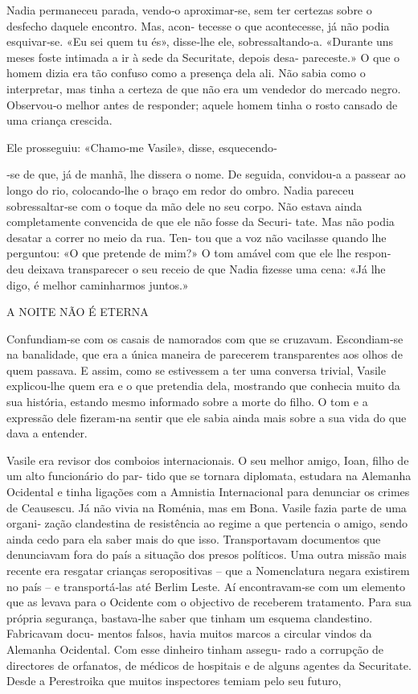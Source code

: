 Nadia permaneceu parada, vendo‑o aproximar‑se, sem ter certezas sobre o
desfecho daquele encontro. Mas, acon‑ tecesse o que acontecesse, já não
podia esquivar‑se. «Eu sei quem tu és», disse‑lhe ele, sobressaltando‑a.
«Durante uns meses foste intimada a ir à sede da Securitate, depois
desa‑ pareceste.» O que o homem dizia era tão confuso como a presença
dela ali. Não sabia como o interpretar, mas tinha a certeza de que não
era um vendedor do mercado negro. Observou‑o melhor antes de responder;
aquele homem tinha o rosto cansado de uma criança crescida.

Ele prosseguiu: «Chamo‑me Vasile», disse, esquecendo‑

‑se de que, já de manhã, lhe dissera o nome. De seguida, convidou‑a a
passear ao longo do rio, colocando‑lhe o braço em redor do ombro. Nadia
pareceu sobressaltar‑se com o toque da mão dele no seu corpo. Não estava
ainda completamente convencida de que ele não fosse da Securi‑ tate. Mas
não podia desatar a correr no meio da rua. Ten‑ tou que a voz não
vacilasse quando lhe perguntou: «O que pretende de mim?» O tom amável
com que ele lhe respon‑ deu deixava transparecer o seu receio de que
Nadia fizesse uma cena: «Já lhe digo, é melhor caminharmos juntos.»

A NOITE NÃO É ETERNA

Confundiam‑se com os casais de namorados com que se cruzavam.
Escondiam‑se na banalidade, que era a única maneira de parecerem
transparentes aos olhos de quem passava. E assim, como se estivessem a
ter uma conversa trivial, Vasile explicou‑lhe quem era e o que pretendia
dela, mostrando que conhecia muito da sua história, estando mesmo
informado sobre a morte do filho. O tom e a expressão dele fizeram‑na
sentir que ele sabia ainda mais sobre a sua vida do que dava a entender.

Vasile era revisor dos comboios internacionais. O seu melhor amigo,
Ioan, filho de um alto funcionário do par‑ tido que se tornara
diplomata, estudara na Alemanha Ocidental e tinha ligações com a
Amnistia Internacional para denunciar os crimes de Ceausescu. Já não
vivia na Roménia, mas em Bona. Vasile fazia parte de uma organi‑ zação
clandestina de resistência ao regime a que pertencia o amigo, sendo
ainda cedo para ela saber mais do que isso. Transportavam documentos que
denunciavam fora do país a situação dos presos políticos. Uma outra
missão mais recente era resgatar crianças seropositivas -- que a
Nomenclatura negara existirem no país -- e transportá‑las até Berlim
Leste. Aí encontravam‑se com um elemento que as levava para o Ocidente
com o objectivo de receberem tratamento. Para sua própria segurança,
bastava‑lhe saber que tinham um esquema clandestino. Fabricavam docu‑
mentos falsos, havia muitos marcos a circular vindos da Alemanha
Ocidental. Com esse dinheiro tinham assegu‑ rado a corrupção de
directores de orfanatos, de médicos de hospitais e de alguns agentes da
Securitate. Desde a Perestroika que muitos inspectores temiam pelo seu
futuro,

